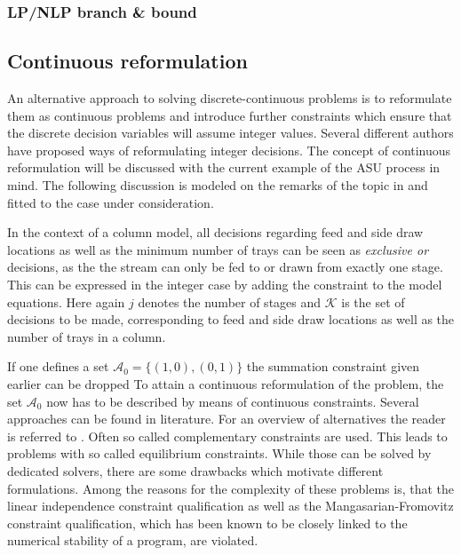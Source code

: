         \subsubsection{LP/NLP branch \& bound}



    \subsection{Continuous reformulation}
    \label{sec:opt:theory:continuous}
    An alternative approach to solving discrete-continuous problems is to reformulate them as continuous problems
    and introduce further constraints which ensure that the discrete decision variables will assume integer values.
    Several different authors have proposed ways of reformulating integer decisions. The concept of continuous reformulation
    will be discussed with the current example of the ASU process in mind. The following discussion is modeled on the
    remarks of the topic in \cite{Stein.2004} and fitted to the case under consideration.

    In the context of a column model, all decisions regarding feed and side draw locations as well as the minimum number
    of trays can be seen as \emph{exclusive or} decisions, as the the stream can only be fed to or drawn from exactly one
    stage. This can be expressed in the integer case by adding the constraint
    to the model equations. Here again $j$ denotes the number of stages and $\mathcal{K}$ is the set of decisions to be made,
    corresponding to feed and side draw locations as well as the number of trays in a column.

    If one defines a set $\mathcal{A}_0 = \{(1,0), (0,1)\}$ the summation constraint given earlier can be dropped
    To attain a continuous reformulation of the problem, the set $\mathcal{A}_0$ now has to be described by means
    of continuous constraints. Several approaches can be found in literature. For an overview of alternatives
    the reader is referred to \cite{Stein.2004}. Often so called complementary constraints are used. This leads
    to problems with so called equilibrium constraints. While those can be solved by dedicated solvers, there are
    some drawbacks which motivate different formulations. Among the reasons for the complexity of these problems is,
    that the linear independence constraint qualification as well as the Mangasarian-Fromovitz constraint qualification,
    which has been known to be closely linked to the numerical stability of a program,  are violated.

